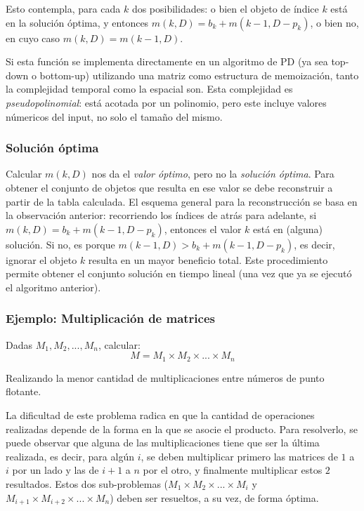 Esto contempla, para cada $k$ dos posibilidades: o bien el objeto de índice $k$ está en la solución óptima, y entonces $m(k, D) = b_k + m(k - 1, D - p_k)$, o bien no, en cuyo caso $m(k, D) = m(k - 1, D)$.

Si esta función se implementa directamente en un algoritmo de PD (ya sea top-down o bottom-up) utilizando una matriz como estructura de memoización, tanto la complejidad temporal como la espacial son. Esta complejidad es \textit{pseudopolinomial}: está acotada por un polinomio, pero este incluye valores númericos del input, no solo el tamaño del mismo.

\subsubsection{Solución óptima}
\label{reconstruccion-solucion}

Calcular $m(k, D)$ nos da el \textit{valor óptimo}, pero no la \textit{solución óptima}. Para obtener el conjunto de objetos que resulta en ese valor se debe reconstruir a partir de la tabla calculada. El esquema general para la reconstrucción se basa en la observación anterior: recorriendo los índices de atrás para adelante, si $m(k, D) = b_k + m(k - 1, D - p_k)$, entonces el valor $k$ está en (alguna) solución. Si no, es porque $m(k - 1, D) > b_k + m(k - 1, D - p_k)$, es decir, ignorar el objeto $k$ resulta en un mayor beneficio total. Este procedimiento permite obtener el conjunto solución en tiempo lineal (una vez que ya se ejecutó el algoritmo anterior).

\subsubsection{Ejemplo: Multiplicación de matrices}

\begin{problema}
    Dadas $M_1, M_2, ..., M_n$, calcular:
    $$M = M_1 \times M_2 \times ... \times M_n$$

    Realizando la menor cantidad de multiplicaciones entre números de punto flotante.
\end{problema}

La dificultad de este problema radica en que la cantidad de operaciones realizadas depende de la forma en la que se asocie el producto. Para resolverlo, se puede observar que alguna de las multiplicaciones tiene que ser la última realizada, es decir, para algún $i$, se deben multiplicar primero las matrices de $1$ a $i$ por un lado y las de $i + 1$ a $n$ por el otro, y finalmente multiplicar estos $2$ resultados. Estos dos sub-problemas ($M_1 \times M_2 \times ... \times M_i$ y $M_{i+1} \times M_{i+2}\times ... \times M_n$) deben ser resueltos, a su vez, de forma óptima.

